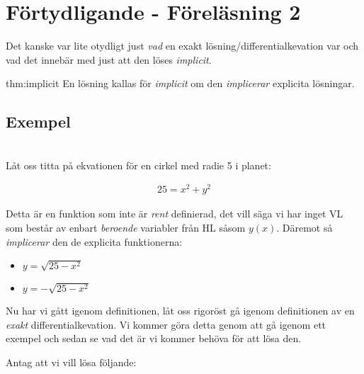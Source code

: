 \section{Förtydligande - Föreläsning 2}

\noindent Det kanske var lite otydligt just \textit{vad} en exakt lösning/differentialkevation var och vad det innebär med just att den löses \textit{implicit}.
\par\bigskip

\begin{theo}{thm:implicit}
  En lösning kallas för \textit{implicit} om den \textit{implicerar} explicita lösningar.
\end{theo}
\par\bigskip

\subsection{Exempel}\hfill\\

\noindent Låt oss titta på ekvationen för en cirkel med radie 5 i planet:

\begin{equation*}
  \begin{gathered}
    25=x^2+y^2
  \end{gathered}
\end{equation*}

\noindent Detta är en funktion som inte är \textit{rent} definierad, det vill säga vi har inget VL som består av enbart \textit{beroende} variabler från HL såsom $y(x)$. Däremot så \textit{implicerar} den de explicita funktionerna:
\par\bigskip

\begin{itemize}
  \item $y=\sqrt{25-x^2}$
    \par\bigskip

  \item $y=-\sqrt{25-x^2}$
\end{itemize}
\par\bigskip

\noindent Nu har vi gått igenom definitionen, låt oss rigoröst gå igenom definitionen av en \textit{exakt} differentialkevation. Vi kommer göra detta genom att gå igenom ett exempel och sedan se vad det är vi kommer behöva för att lösa den.
\par\bigskip

\noindent Antag att vi vill lösa följande:


